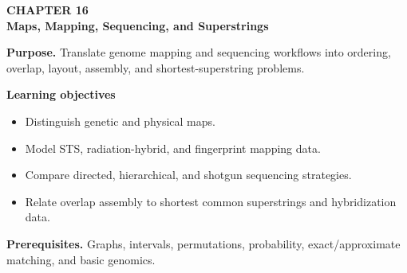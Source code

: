 \documentclass[11pt]{article}
\begin{document}
\begin{tcolorbox}[
  enhanced,breakable,colback=Primary!4,colframe=Primary,boxrule=0.9pt,
  arc=2mm,left=3mm,right=3mm,top=2.5mm,bottom=2.5mm]
{\sffamily\color{Accent}\bfseries CHAPTER 16}\\[-1pt]
{\sffamily\LARGE\bfseries\color{Primary} Maps, Mapping, Sequencing, and Superstrings}

\vspace{2pt}
\textbf{Purpose.} Translate genome mapping and sequencing workflows into ordering, overlap, layout, assembly, and shortest-superstring problems.

\textbf{Learning objectives}
\begin{itemize}
  \item Distinguish genetic and physical maps.
  \item Model STS, radiation-hybrid, and fingerprint mapping data.
  \item Compare directed, hierarchical, and shotgun sequencing strategies.
  \item Relate overlap assembly to shortest common superstrings and hybridization data.
\end{itemize}

\textbf{Prerequisites.} Graphs, intervals, permutations, probability, exact/approximate matching, and basic genomics.
\end{tcolorbox}
\end{document}
